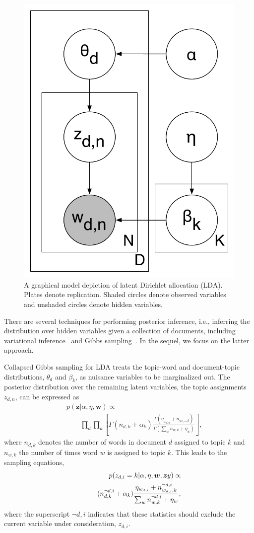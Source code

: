 \begin{figure}
\centering
\includegraphics[width=0.5\linewidth]{figures/lda}
\caption{A graphical model depiction of latent Dirichlet allocation
  (LDA).  Plates denote replication.  Shaded circles denote observed
  variables and unshaded circles denote hidden variables.}
\label{fig:lda}
\end{figure}


There are several techniques for performing posterior inference,
i.e., inferring the distribution over hidden variables given a
collection of documents, including variational
inference~\cite{blei-03} and Gibbs sampling~\cite{griffiths-06}.  In
the sequel, we focus on the latter approach.  

Collapsed Gibbs sampling for LDA treats the topic-word and
document-topic distributions, $\theta_d$ and $\beta_k$, as nuisance
variables to be marginalized out. The posterior distribution over the
remaining latent variables, the topic assignments $z_{d,n}$, can be
expressed as
\begin{eqnarray*}
  &&p(\bm{z} | \alpha, \eta, \bm{w}) \propto \\
  &&\qquad \prod_{d}\prod_{k} \left[ \Gamma(n_{d,k} + \alpha_{k})\frac{\Gamma(\eta_{w_{d,n}} + n_{w_{d,n}, k})}{\Gamma(\sum_w n_{w, k} + \eta_w)}\right],
\end{eqnarray*}
where $n_{d,k}$ denotes the number of words in document $d$ assigned
to topic $k$ and $n_{w,k}$ the number of times word $w$ is assigned to
topic $k$.  This leads to the sampling equations,
\begin{eqnarray}
  &&p(z_{d,i} = k | \alpha, \eta, \bm{w}, \bm{z}y) \propto \notag \\
  &&\qquad (n^{\lnot d,i}_{d,k} + \alpha_{k})\frac{\eta_{w_{d,i}} + n^{\lnot d,i}_{w_{d,i}, k}}{\sum_w n^{\lnot d,i}_{w, k} + \eta_w},
  \label{eq:sampling}
\end{eqnarray}
where the superscript $\lnot d,i$ indicates that these statistics
should exclude the current variable under consideration, $z_{d,i}$.

